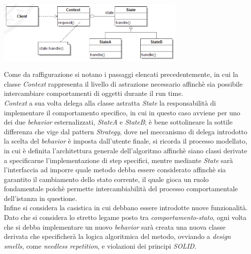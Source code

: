 \documentclass{article}
\begin{document}
\begin{center}
    \includegraphics[width=0.7\textwidth]{foto 1.png}
\end{center}
Come da raffigurazione si notano i passaggi elencati precedentemente, in cui la classe \textit{Context} rappresenta il livello di astrazione necessario affinchè sia possibile intercambiare comportamenti di oggetti durante il run time.\\
\textit{Context} a sua volta delega alla classe astratta \textit{State} la responsabilità di implementare il comportamento specifico, in cui in questo caso avviene per uno dei due \textit{behavior} esternalizzati, \textit{StateA} e \textit{StateB}; è bene sottolineare la sottile differenza che vige dal pattern \textit{Strategy}, dove nel meccanismo di delega introdotto la scelta del \textit{behavior} è imposta dall'utente finale, si ricorda il processo modellato, in cui è definita l'architettura generale dell'algoritmo affinchè siano classi derivate a specificarne l'implementazione di step specifici, mentre mediante \textit{State} sarà l'interfaccia ad imporre quale metodo debba essere considerato affinchè sia garantito il cambiamento dello stato corrente, il quale gioca un ruolo fondamentale poichè permette  intercambiabilità del processo comportamentale dell'istanza in questione.\vspace*{14pt}\\
Infine si considera la casistica in cui debbano essere introdotte nuove funzionalità. Dato che si considera lo stretto legame posto tra \textit{comportamento-stato}, ogni volta che si debba implementare un nuovo \textit{behavior} sarà creata una nuova classe derivata che specificherà la logica algoritmica del metodo, ovviando a \textit{design smells}, come \textit{needless repetition}, e violazioni dei principi \textit{SOLID}. 
\end{document}

